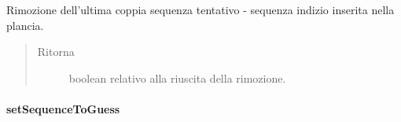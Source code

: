 \documentclass[letterpaper,10pt,italian,openany,oneside]{sphinxmanual}
\begin{document}
\begin{fulllineitems}
\label{\detokenize{source/it/unicam/cs/pa/mastermind/gamecore/BoardModel:it.unicam.cs.pa.mastermind.gamecore.BoardModel.removeLastAttemptAndClue()}}
Rimozione dell’ultima coppia sequenza tentativo - sequenza indizio inserita nella plancia.
\begin{quote}\begin{description}
\item[{Ritorna}] \leavevmode
boolean relativo alla riuscita della rimozione.

\end{description}\end{quote}

\end{fulllineitems}



\paragraph{setSequenceToGuess}
\label{\detokenize{source/it/unicam/cs/pa/mastermind/gamecore/BoardModel:setsequencetoguess}}
\end{document}
